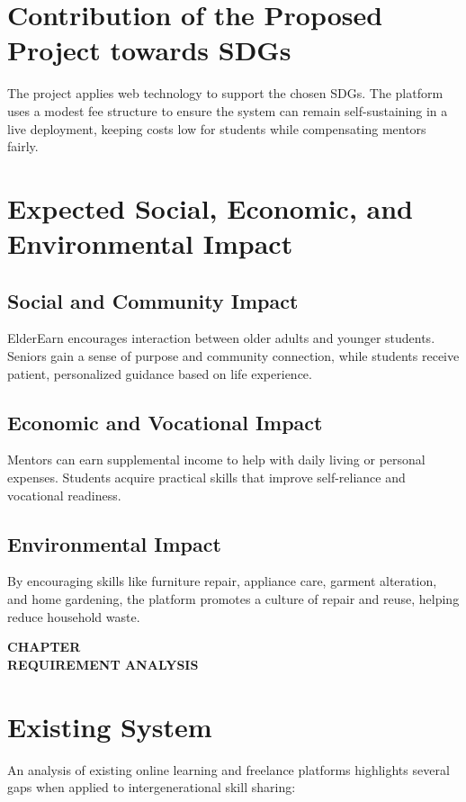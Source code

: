 \documentclass[12pt,a4paper]{report}
\newcommand{\chaptertitlepage}[1]{%
  \clearpage
  \thispagestyle{empty}
  \null
  \vfill
  \begin{center}
    {\fontsize{16pt}{18pt}\selectfont\bfseries CHAPTER \thechapter}\\[0.5cm]
    {\fontsize{16pt}{18pt}\selectfont\bfseries #1}
  \end{center}
  \vfill
  \null
  \clearpage
  \setcounter{section}{0}
}
\begin{document}
\section{Contribution of the Proposed Project towards SDGs}
The project applies web technology to support the chosen SDGs. The platform uses a modest fee structure to ensure the system can remain self-sustaining in a live deployment, keeping costs low for students while compensating mentors fairly.

\section{Expected Social, Economic, and Environmental Impact}
\subsection{Social and Community Impact}
ElderEarn encourages interaction between older adults and younger students. Seniors gain a sense of purpose and community connection, while students receive patient, personalized guidance based on life experience.

\subsection{Economic and Vocational Impact}
Mentors can earn supplemental income to help with daily living or personal expenses. Students acquire practical skills that improve self-reliance and vocational readiness.

\subsection{Environmental Impact}
By encouraging skills like furniture repair, appliance care, garment alteration, and home gardening, the platform promotes a culture of repair and reuse, helping reduce household waste.


\chaptertitlepage{REQUIREMENT ANALYSIS}

\section{Existing System}
An analysis of existing online learning and freelance platforms highlights several gaps when applied to intergenerational skill sharing:
\end{document}
